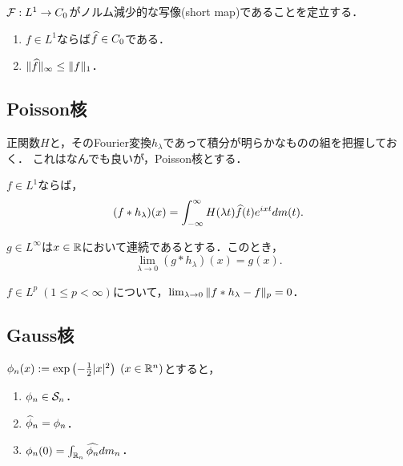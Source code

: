 \documentclass[uplatex,dvipdfmx]{jsreport}
\begin{document}
\begin{theorem}
    $\F:L^1\to C_0$がノルム減少的な写像(short map)であることを定立する．
    \begin{enumerate}
        \item $f\in L^1$ならば$\wh{f}\in C_0$である．
        \item $\norm{\wh{f}}_\infty\le\norm{f}_1$．
    \end{enumerate}
\end{theorem}

\subsection{Poisson核}

\begin{tcolorbox}[colframe=ForestGreen, colback=ForestGreen!10!white,breakable,colbacktitle=ForestGreen!40!white,coltitle=black,fonttitle=\bfseries\sffamily,
title=]
    正関数$H$と，そのFourier変換$h_\lambda$であって積分が明らかなものの組を把握しておく．
    これはなんでも良いが，Poisson核とする．
\end{tcolorbox}

\begin{proposition}
    $f\in L^1$ならば，
    \[(f*h_\lambda)(x)=\int^\infty_{-\infty}H(\lambda t)\wh{f}(t)e^{ixt}dm(t).\]
\end{proposition}

\begin{proposition}
    $g\in L^\infty$は$x\in\R$において連続であるとする．このとき，
    \[\lim_{\lambda\to 0}(g*h_\lambda)(x)=g(x).\]
\end{proposition}

\begin{proposition}
    $f\in L^p\;(1\le p<\infty)$について，$\lim_{\lambda\to0}\norm{f*h_\lambda-f}_p=0$．
\end{proposition}

\subsection{Gauss核}

\begin{lemma}
    $\phi_n(x):=\exp\paren{-\frac{1}{2}\abs{x}^2}\;(x\in\R^n)$とすると，
    \begin{enumerate}
        \item $\phi_n\in\S_n$．
        \item $\wh{\phi}_n=\phi_n$．
        \item $\phi_n(0)=\int_{\R_n}\wh{\phi_n}dm_n$．
    \end{enumerate}
\end{lemma}
\end{document}
